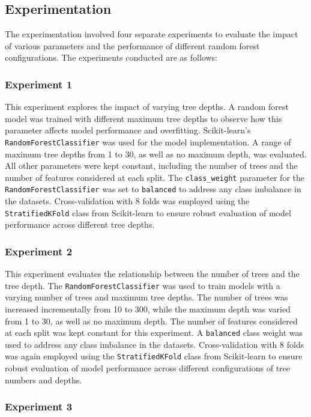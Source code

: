 \documentclass[conference]{IEEEtran}
\begin{document}
\subsection{Experimentation}

The experimentation involved four separate experiments to evaluate the impact of various parameters and the performance of different random forest configurations. The experiments conducted are as follows:

\subsubsection{Experiment 1}

This experiment explores the impact of varying tree depths. A random forest model was trained with different maximum tree depths to observe how this parameter affects model performance and overfitting. Scikit-learn's \texttt{RandomForestClassifier} was used for the model implementation. A range of maximum tree depths from 1 to 30, as well as no maximum depth, was evaluated. All other parameters were kept constant, including the number of trees and the number of features considered at each split. The \texttt{class\_weight} parameter for the \texttt{RandomForestClassifier} was set to \texttt{balanced} to address any class imbalance in the datasets. Cross-validation with 8 folds was employed using the \texttt{StratifiedKFold} class from Scikit-learn to ensure robust evaluation of model performance across different tree depths.

\subsubsection{Experiment 2}

This experiment evaluates the relationship between the number of trees and the tree depth. The \texttt{RandomForestClassifier} was used to train models with a varying number of trees and maximum tree depths. The number of trees was increased incrementally from 10 to 300, while the maximum depth was varied from 1 to 30, as well as no maximum depth. The number of features considered at each split was kept constant for this experiment. A \texttt{balanced} class weight was used to address any class imbalance in the datasets. Cross-validation with 8 folds was again employed using the \texttt{StratifiedKFold} class from Scikit-learn to ensure robust evaluation of model performance across different configurations of tree numbers and depths.

\subsubsection{Experiment 3}
\end{document}
